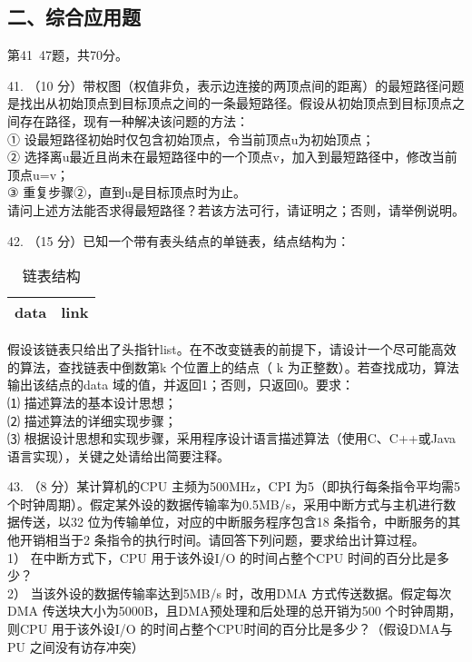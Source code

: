 \subsection{二、综合应用题}
第41~47题，共70分。

41. （10 分）带权图（权值非负，表示边连接的两顶点间的距离）的最短路径问题是找出从初始顶点到目标顶点之间的一条最短路径。假设从初始顶点到目标顶点之间存在路径，现有一种解决该问题的方法： \\
① 设最短路径初始时仅包含初始顶点，令当前顶点u为初始顶点； \\
② 选择离u最近且尚未在最短路径中的一个顶点v，加入到最短路径中，修改当前顶点u=v； \\
③ 重复步骤②，直到u是目标顶点时为止。 \\
请问上述方法能否求得最短路径？若该方法可行，请证明之；否则，请举例说明。

42. （15 分）已知一个带有表头结点的单链表，结点结构为：
\begin{table}[ht]
\centering
\caption{链表结构}\label{CSN09_tab1}
\begin{tabular}{|c|c|}
\hline
data & link \\
\hline
\end{tabular}
\end{table}
假设该链表只给出了头指针list。在不改变链表的前提下，请设计一个尽可能高效的算法，查找链表中倒数第k 个位置上的结点（ k 为正整数）。若查找成功，算法输出该结点的data 域的值，并返回1；否则，只返回0。要求： \\
⑴ 描述算法的基本设计思想； \\
⑵ 描述算法的详细实现步骤； \\
⑶ 根据设计思想和实现步骤，采用程序设计语言描述算法（使用C、C++或Java 语言实现），关键之处请给出简要注释。

43. （8 分）某计算机的CPU 主频为500MHz，CPI 为5（即执行每条指令平均需5 个时钟周期）。假定某外设的数据传输率为0.5MB/s，采用中断方式与主机进行数据传送，以32 位为传输单位，对应的中断服务程序包含18 条指令，中断服务的其他开销相当于2 条指令的执行时间。请回答下列问题，要求给出计算过程。 \\
1） 在中断方式下，CPU 用于该外设I/O 的时间占整个CPU 时间的百分比是多少？ \\
2） 当该外设的数据传输率达到5MB/s 时，改用DMA 方式传送数据。假定每次DMA 传送块大小为5000B，且DMA预处理和后处理的总开销为500 个时钟周期，则CPU 用于该外设I/O 的时间占整个CPU时间的百分比是多少？（假设DMA与PU 之间没有访存冲突）

